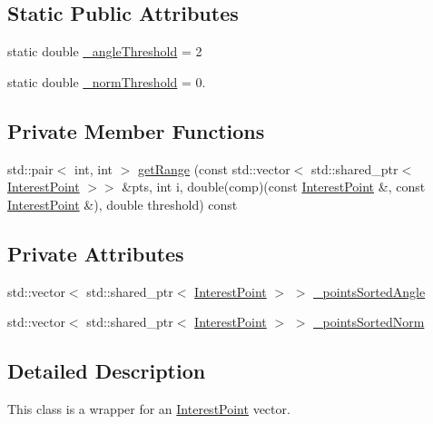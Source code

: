 \subsection*{Static Public Attributes}
\begin{DoxyCompactItemize}
\item 
static double \hyperlink{classdefals_1_1_interest_points_ac33ac69ceafbbe342fd3a43e0f62db3d}{\+\_\+angle\+Threshold} = 2
\item 
static double \hyperlink{classdefals_1_1_interest_points_aaa8ce44dcc32bb8a5be996c0bd9db70c}{\+\_\+norm\+Threshold} = 0.
\end{DoxyCompactItemize}
\subsection*{Private Member Functions}
\begin{DoxyCompactItemize}
\item 
std\+::pair$<$ int, int $>$ \hyperlink{classdefals_1_1_interest_points_a80bfdb00ef73b101ee5627b5a35b8e2e}{get\+Range} (const std\+::vector$<$ std\+::shared\+\_\+ptr$<$ \hyperlink{classdefals_1_1_interest_point}{Interest\+Point} $>$$>$ \&pts, int i, double(comp)(const \hyperlink{classdefals_1_1_interest_point}{Interest\+Point} \&, const \hyperlink{classdefals_1_1_interest_point}{Interest\+Point} \&), double threshold) const
\end{DoxyCompactItemize}
\subsection*{Private Attributes}
\begin{DoxyCompactItemize}
\item 
std\+::vector$<$ std\+::shared\+\_\+ptr$<$ \hyperlink{classdefals_1_1_interest_point}{Interest\+Point} $>$ $>$ \hyperlink{classdefals_1_1_interest_points_acb150169938a65343ff586737deb0ee4}{\+\_\+points\+Sorted\+Angle}
\item 
std\+::vector$<$ std\+::shared\+\_\+ptr$<$ \hyperlink{classdefals_1_1_interest_point}{Interest\+Point} $>$ $>$ \hyperlink{classdefals_1_1_interest_points_af2d65ed03d451cd08ab3a8a2f31f7801}{\+\_\+points\+Sorted\+Norm}
\end{DoxyCompactItemize}


\subsection{Detailed Description}
This class is a wrapper for an \hyperlink{classdefals_1_1_interest_point}{Interest\+Point} vector.

